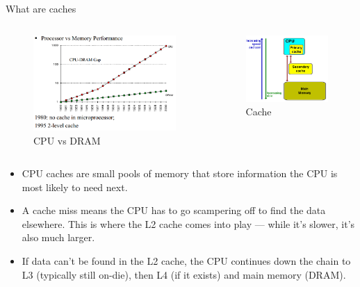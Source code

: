 \documentclass[10pt,times]{beamer}
\begin{document}
\begin{frame}{What are caches}
\begin{columns}
\begin{figure}
\includegraphics[width=0.9\linewidth]{figs/CPU_DRAM}
\caption*{CPU vs DRAM}
\end{figure}

\begin{figure}
\includegraphics[width=.7\linewidth]{figs/cache}
\caption*{Cache}
\end{figure}
\end{columns}
\begin{itemize}
\item CPU caches are small pools of memory that store information the CPU 
is most 
likely to need next.

\item A cache miss means the CPU has to go scampering off to find the 
data elsewhere. This is where the L2 cache comes into play — while it's 
slower, it's 
also much larger. 

\item If data can't be found in the L2 cache, the CPU continues down the 
chain to L3 
(typically still on-die), then L4 (if it exists) and main memory (DRAM).

\end{itemize}
\end{frame}
\end{document}
